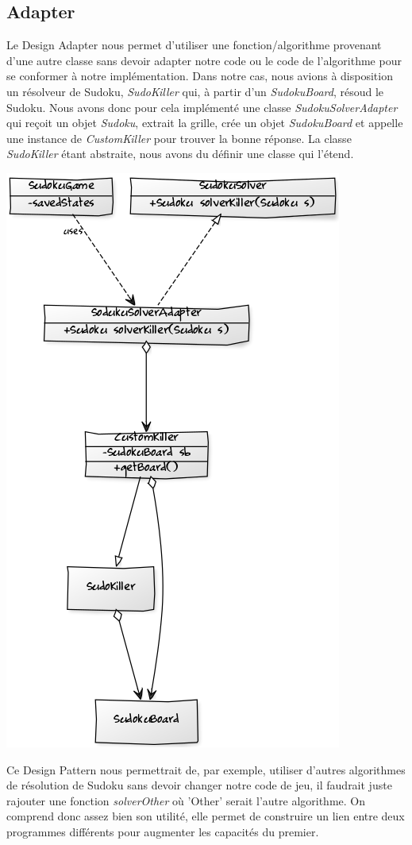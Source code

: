 \documentclass[a4paper]{article}
\begin{document}
\subsection{Adapter}
Le Design Adapter nous permet d'utiliser une fonction/algorithme provenant d'une autre classe sans devoir adapter notre code ou le code de l'algorithme pour se conformer à notre implémentation.
Dans notre cas, nous avions à disposition un résolveur de Sudoku, \textit{SudoKiller} qui, à partir d'un \textit{SudokuBoard}, résoud le Sudoku.
Nous avons donc pour cela implémenté une classe \textit{SudokuSolverAdapter} qui reçoit un objet \textit{Sudoku}, extrait la grille, crée un objet \textit{SudokuBoard} et appelle une instance de \textit{CustomKiller} pour trouver la bonne réponse.
La classe \textit{SudoKiller} étant abstraite, nous avons du définir une classe qui l'étend.
\begin{center}
\includegraphics[scale=0.7]{../diagrams/adapter.png}
\end{center}
Ce Design Pattern nous permettrait de, par exemple, utiliser d'autres algorithmes de résolution de Sudoku sans devoir changer notre code de jeu, il faudrait juste rajouter une fonction \textit{solverOther} où 'Other' serait l'autre algorithme.
On comprend donc assez bien son utilité, elle permet de construire un lien entre deux programmes différents pour augmenter les capacités du premier.
\newpage
\end{document}
